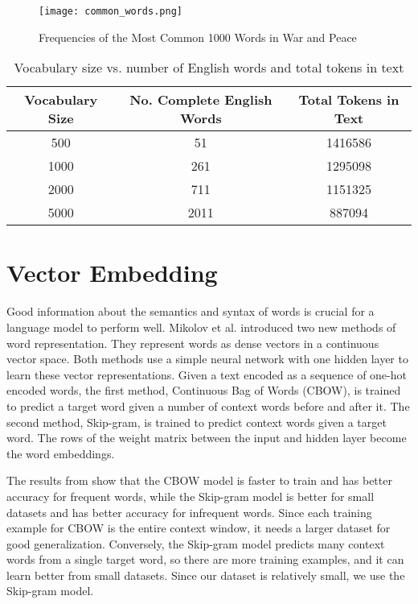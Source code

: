 \documentclass[a4paper, 11pt]{article}
\begin{document}
\begin{figure}
    \centering
    \texttt{[image: common\_words.png]}
    \caption{Frequencies of the Most Common 1000 Words in War and Peace}
    \label{fig:word_frequencies}
\end{figure}

\begin{table}[h!]
\centering
\begin{tabular}{|c|c|c|}
\hline
Vocabulary Size & No. Complete English Words & Total Tokens in Text \\
\hline
500 & 51 & 1416586 \\
1000 & 261 & 1295098 \\
2000 & 711 & 1151325 \\
5000 & 2011 & 887094 \\
\hline
\end{tabular}
\caption{Vocabulary size vs. number of English words and total tokens in text}
\label{tab:vocab_size_vs_complete_words}
\end{table}


\section{Vector Embedding}

Good information about the semantics and syntax of words is crucial for a language model to perform well. Mikolov et al. \cite{mikolov2013efficient} introduced two new methods of word representation. They represent words as dense vectors in a continuous vector space. Both methods use a simple neural network with one hidden layer to learn these vector representations. Given a text encoded as a sequence of one-hot encoded words, the first method, Continuous Bag of Words (CBOW), is trained to predict a target word given a number of context words before and after it. The second method, Skip-gram, is trained to predict context words given a target word. The rows of the weight matrix between the input and hidden layer become the word embeddings.

The results from \cite{mikolov2013efficient} show that the CBOW model is faster to train and has better accuracy for frequent words, while the Skip-gram model is better for small datasets and has better accuracy for infrequent words. Since each training example for CBOW is the entire context window, it needs a larger dataset for good generalization. Conversely, the Skip-gram model predicts many context words from a single target word, so there are more training examples, and it can learn better from small datasets. Since our dataset is relatively small, we use the Skip-gram model.
\end{document}
